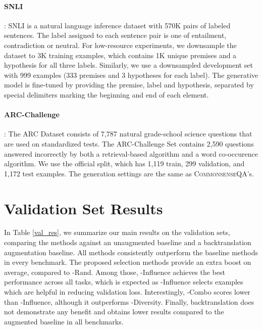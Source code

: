 \documentclass[11pt,a4paper]{article}
\newcommand{\gdaug}{}
\newcommand{\comqa}{\textsc{CommonsenseQA}\xspace}
\begin{document}
\paragraph{SNLI} \cite{bowman2015large}: SNLI is a natural language inference dataset with 570K pairs of labeled sentences. The label assigned to each sentence pair is one of entailment, contradiction or neutral. For low-resource experiments, we downsample the dataset to 3K training examples, which contains 1K unique premises and a hypothesis for all three labels. Similarly, we use a downsampled development set with 999 examples (333 premises and 3 hypotheses for each label). The generative model is fine-tuned by providing the premise, label and hypothesis, separated by special delimiters marking the beginning and end of each element.


\paragraph{ARC-Challenge} \cite{Clark2018ThinkYH}: The ARC Dataset consists of 7,787 natural grade-school science questions that are used on standardized tests. The ARC-Challenge Set contains 2,590 questions answered incorrectly by both a retrieval-based algorithm and a word co-occurence algorithm. We use the official split, which has 1,119 train, 299 validation, and 1,172 test examples. The generation settings are the same as \comqa's.






\section{Validation Set Results}
In Table \ref{val_res}, we summarize our main results on the validation sets, comparing the \gdaug methods against an unaugmented baseline and a backtranslation augmentation baseline. All \gdaug methods consistently outperform the baseline methods in every benchmark. The proposed selection methods provide an extra boost on average, compared to \gdaug-Rand. Among those, \gdaug-Influence achieves the best performance across all tasks, which is expected as \gdaug-Influence selects examples which are helpful in reducing validation loss. Interestingly, \gdaug-Combo scores lower than \gdaug-Influence, although it outperforms \gdaug-Diversity. Finally, backtranslation does not demonstrate any benefit and obtains lower results compared to the augmented baseline in all benchmarks. 
\end{document}
